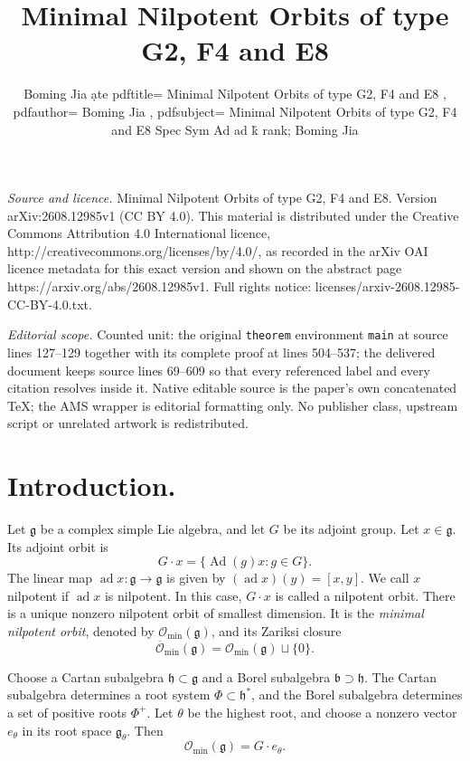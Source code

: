 \documentclass[10pt,a4paper]{amsart}
\DeclareMathOperator{\Ad}{Ad}
\DeclareMathOperator{\ad}{ad}
\newcommand{\Lieg}{\mathfrak{g}}
\newcommand{\h}{\mathfrak h}
\newcommand{\Omin}{\mathcal O_{\min}}
\newcommand{\Ominbar}{\overline{\mathcal O}_{\min}}
\begin{document}
\title[Minimal Nilpotent Orbits of type G2, F4 and E8]{Minimal Nilpotent Orbits of type G2, F4 and E8}
\author{Boming Jia ạte pdftitle= Minimal Nilpotent Orbits of type G2, F4 and E8 , pdfauthor= Boming Jia , pdfsubject= Minimal Nilpotent Orbits of type G2, F4 and E8 Spec Sym Ad ad k̊ rank; Boming Jia}
\date{}
\maketitle
\noindent\emph{Source and licence.} Minimal Nilpotent Orbits of type G2, F4 and E8. Version arXiv:2608.12985v1 (CC BY 4.0). This material is distributed under the Creative Commons Attribution 4.0 International licence, http://creativecommons.org/licenses/by/4.0/, as recorded in the arXiv OAI licence metadata for this exact version and shown on the abstract page https://arxiv.org/abs/2608.12985v1. Full rights notice: licenses/arxiv-2608.12985-CC-BY-4.0.txt.\par\smallskip
\noindent\textit{Editorial scope.} Counted unit: the original \texttt{theorem} environment \texttt{main} at source lines 127--129 together with its complete proof at lines 504--537; the delivered document keeps source lines 69--609 so that every referenced label and every citation resolves inside it. Native editable source is the paper's own concatenated TeX; the AMS wrapper is editorial formatting only. No publisher class, upstream script or unrelated artwork is redistributed.
\section{Introduction.}

Let $\Lieg$ be a complex simple Lie algebra, and let $G$ be its adjoint group. Let $x\in\Lieg$. Its adjoint orbit is
\[
    G\cdot x=\{\Ad(g)x:g\in G\}.
\]
The linear map $\ad x:\Lieg\to\Lieg$ is given by $(\ad x)(y)=[x,y]$. We call $x$ {nilpotent} if $\ad x$ is nilpotent. In this case, $G\cdot x$ is called a {nilpotent orbit}. There is a unique nonzero nilpotent orbit of smallest dimension. It is the \emph{minimal nilpotent orbit}, denoted by $\Omin(\Lieg)$, and its Zariksi closure
    $$\Ominbar(\Lieg)=\Omin(\Lieg)\sqcup\{0\}.$$

Choose a Cartan subalgebra $\h\subset\Lieg$ and a Borel subalgebra $\mathfrak b\supset\h$. The Cartan subalgebra determines a root system $\Phi\subset\h^*$, and the Borel subalgebra determines a set of positive roots $\Phi^+$. Let $\theta$ be the highest root, and choose a nonzero vector $e_\theta$ in its root space $\Lieg_\theta$. Then
\[
    \Omin(\Lieg)=G\cdot e_\theta.
\]
\end{document}

